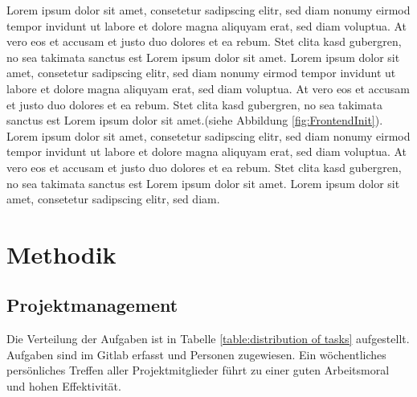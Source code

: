 \documentclass[a4paper]{spie}  %
\begin{document}
Lorem ipsum dolor sit amet, consetetur sadipscing elitr, sed diam nonumy eirmod tempor invidunt ut labore et dolore magna aliquyam erat, sed diam voluptua. At vero eos et accusam et justo duo dolores et ea rebum. Stet clita kasd gubergren, no sea takimata sanctus est Lorem ipsum dolor sit amet. Lorem ipsum dolor sit amet, consetetur sadipscing elitr, sed diam nonumy eirmod tempor invidunt ut labore et dolore magna aliquyam erat, sed diam voluptua. At vero eos et accusam et justo duo dolores et ea rebum. Stet clita kasd gubergren, no sea takimata sanctus est Lorem ipsum dolor sit amet.(siehe Abbildung \ref{fig:FrontendInit}).
\\
Lorem ipsum dolor sit amet, consetetur sadipscing elitr, sed diam nonumy eirmod tempor invidunt ut labore et dolore magna aliquyam erat, sed diam voluptua. At vero eos et accusam et justo duo dolores et ea rebum. Stet clita kasd gubergren, no sea takimata sanctus est Lorem ipsum dolor sit amet. Lorem ipsum dolor sit amet, consetetur sadipscing elitr, sed diam.

\section{Methodik}
\subsection{Projektmanagement}
Die Verteilung der Aufgaben ist in Tabelle \ref{table:distribution of tasks} aufgestellt.
Aufgaben sind im Gitlab erfasst und Personen zugewiesen. Ein wöchentliches persönliches Treffen aller Projektmitglieder führt zu einer guten Arbeitsmoral und hohen Effektivität.
\end{document}

